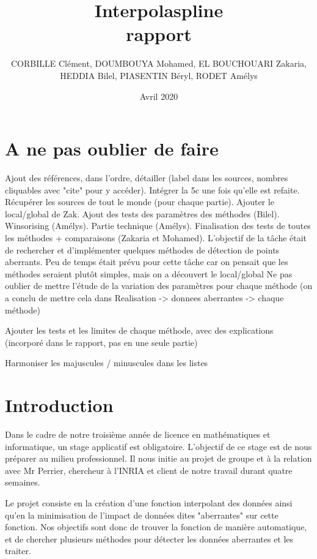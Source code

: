 \documentclass[a4paper,12pt]{article} %
\title{\textbf{Interpolaspline}\\ rapport}
\author{CORBILLE Clément, DOUMBOUYA Mohamed, EL BOUCHOUARI Zakaria, \\HEDDIA Bilel, PIASENTIN Béryl, RODET Amélys }
\date{Avril 2020}
\begin{document}
\maketitle
\tableofcontents

\part{A ne pas oublier de faire}
Ajout des références, dans l'ordre, détailler (label dans les sources, nombres cliquables avec "cite" pour y accéder). Intégrer la 5c une fois qu'elle est refaite. Récupérer les sources de tout le monde (pour chaque partie). Ajouter le local/global de Zak. Ajout des tests des paramètres des méthodes (Bilel). Winsorising (Amélys). Partie technique (Amélys). Finalisation des tests de toutes les méthodes + comparaisons (Zakaria et Mohamed).
            L'objectif de la tâche était de rechercher et d'implémenter quelques méthodes de détection de points aberrants. Peu de temps était prévu pour cette tâche car on pensait que les méthodes seraient plutôt simples, mais on a découvert le local/global
            Ne pas oublier de mettre l'étude de la variation des paramètres pour chaque méthode (on a conclu de mettre cela dans Realisation -> donnees aberrantes -> chaque méthode)
            
            
            
            Ajouter les tests et les limites de chaque méthode, avec des explications (incorporé dans le rapport, pas en une seule partie)
            
Harmoniser les majuscules / minuscules dans les listes 

\renewcommand\partname{}
\part{Introduction}
    Dans le cadre de notre troisième année de licence en mathématiques et informatique, un stage applicatif est obligatoire. L'objectif de ce stage est de nous préparer au milieu professionnel. Il nous initie au projet de groupe et à la relation avec Mr Perrier, chercheur à l'INRIA et client de notre travail durant quatre semaines. 

    Le projet consiste en la création d'une fonction interpolant des données ainsi qu'en la minimisation de l'impact de données dites "aberrantes" sur cette fonction. Nos objectifs sont donc de trouver la fonction de manière automatique, et de chercher plusieurs méthodes pour détecter les données aberrantes et les traiter.\\
\end{document}
